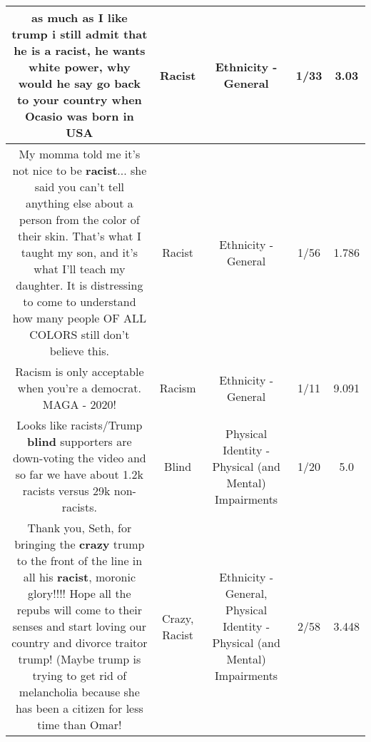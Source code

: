\documentclass[11pt]{article}
\newlength\mylength
\begin{document}
\begin{center}
\begin{longtable}{|C{.65\mylength}|C{.30\mylength}|C{.12\mylength}|C{.12\mylength}|C{.12\mylength}|}
  \small as much as I like trump i still admit that he is a \textbf{racist}, he wants white power, why would he say go back to your country when Ocasio was born in USA\normalsize   & Racist & Ethnicity - General & 1/33 & 3.03 \\  \hline
  \small My momma told me it's not nice to be \textbf{racist}... she said you can't tell anything else about a person from the color of their skin.  That's what I taught my son, and it's what I'll teach my daughter.  It is distressing to come to understand how many people OF ALL COLORS still don't believe this.\normalsize   & Racist & Ethnicity - General & 1/56 & 1.786 \\  \hline
  \small Racism is only acceptable when you're a democrat. MAGA - 2020!\normalsize   & Racism & Ethnicity - General & 1/11 & 9.091 \\  \hline
  \small Looks like racists/Trump \textbf{blind} supporters are down-voting the video and so far we have about 1.2k racists versus 29k non-racists.\normalsize   & Blind & Physical Identity - Physical (and Mental) Impairments & 1/20 & 5.0 \\  \hline
  \small Thank you, Seth, for bringing the \textbf{crazy} trump to the front of the line in all his \textbf{racist}, moronic glory!!!!  Hope all the repubs will come to their senses and start loving our country and divorce traitor trump!   (Maybe trump is trying to get rid of melancholia because she has been a citizen for less time than Omar!\normalsize   & Crazy, Racist & Ethnicity - General, Physical Identity - Physical (and Mental) Impairments & 2/58 & 3.448 \\  \hline

\end{longtable}
\end{center}
\end{document}
